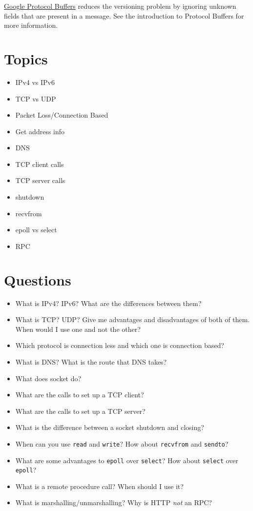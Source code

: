 \href{https://developers.google.com/protocol-buffers/docs/overview}{Google Protocol Buffers} reduces the versioning problem by ignoring unknown fields that are present in a message. See the introduction to Protocol Buffers for more information.

\section{Topics}\label{topics}

\begin{itemize}
\tightlist
\item
  IPv4 vs IPv6
\item
  TCP vs UDP
\item
  Packet Loss/Connection Based
\item
  Get address info
\item
  DNS
\item
  TCP client calls
\item
  TCP server calls
\item
  shutdown
\item
  recvfrom
\item
  epoll vs select
\item
  RPC
\end{itemize}

\section{Questions}\label{questions}

\begin{itemize}
\tightlist
\item
  What is IPv4? IPv6? What are the differences between them?
\item
  What is TCP? UDP? Give me advantages and disadvantages of both of them. When would I use one and not the other?
\item
  Which protocol is connection less and which one is connection based?
\item
  What is DNS? What is the route that DNS takes?
\item
  What does socket do?
\item
  What are the calls to set up a TCP client?
\item
  What are the calls to set up a TCP server?
\item
  What is the difference between a socket shutdown and closing?
\item
  When can you use \texttt{read} and \texttt{write}? How about \texttt{recvfrom} and \texttt{sendto}?
\item
  What are some advantages to \texttt{epoll} over \texttt{select}? How about \texttt{select} over \texttt{epoll}?
\item
  What is a remote procedure call? When should I use it?
\item
  What is marshalling/unmarshalling? Why is HTTP \emph{not} an RPC?
\end{itemize}


